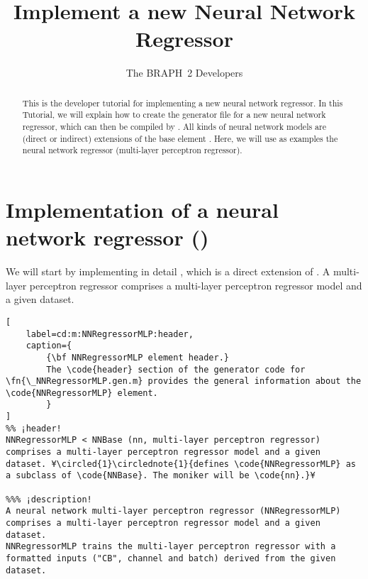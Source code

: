 \documentclass{tufte-handout}
\title{Implement a new Neural Network Regressor}
\author[The BRAPH~2 Developers]{The BRAPH~2 Developers}
\begin{document}
\maketitle

\begin{abstract}
\noindent
This is the developer tutorial for implementing a new neural network regressor. 
In this Tutorial, we will explain how to create the generator file  for a new neural network regressor, which can then be compiled by . All kinds of neural network models are (direct or indirect) extensions of the base element . Here, we will use as examples the neural network regressor  (multi-layer perceptron regressor).
\end{abstract}

\tableofcontents

\clearpage

\section{Implementation of a neural network regressor ()}

We will start by implementing in detail , which is a direct extension of .
A multi-layer perceptron regressor  comprises a multi-layer perceptron regressor model and a given dataset.

\begin{lstlisting}[
	label=cd:m:NNRegressorMLP:header,
	caption={
		{\bf NNRegressorMLP element header.}
		The \code{header} section of the generator code for \fn{\_NNRegressorMLP.gen.m} provides the general information about the \code{NNRegressorMLP} element.
		}
]
%% ¡header!
NNRegressorMLP < NNBase (nn, multi-layer perceptron regressor) comprises a multi-layer perceptron regressor model and a given dataset. ¥\circled{1}\circlednote{1}{defines \code{NNRegressorMLP} as a subclass of \code{NNBase}. The moniker will be \code{nn}.}¥

%%% ¡description!
A neural network multi-layer perceptron regressor (NNRegressorMLP) comprises a multi-layer perceptron regressor model and a given dataset.
NNRegressorMLP trains the multi-layer perceptron regressor with a formatted inputs ("CB", channel and batch) derived from the given dataset.
\end{lstlisting}
\end{document}

